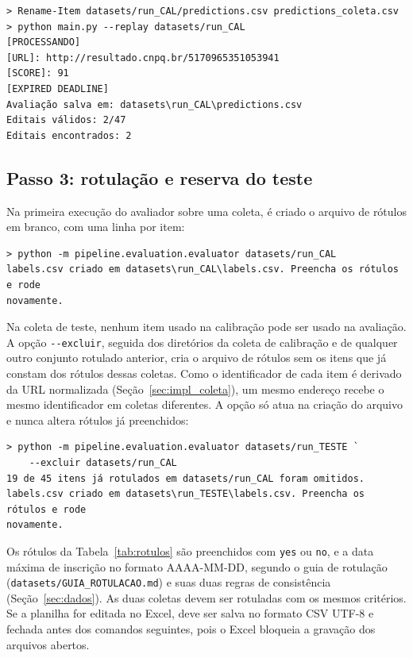 \begin{footnotesize}
\begin{verbatim}
> Rename-Item datasets/run_CAL/predictions.csv predictions_coleta.csv
> python main.py --replay datasets/run_CAL
[PROCESSANDO]
[URL]: http://resultado.cnpq.br/5170965351053941
[SCORE]: 91
[EXPIRED DEADLINE]
Avaliação salva em: datasets\run_CAL\predictions.csv
Editais válidos: 2/47
Editais encontrados: 2
\end{verbatim}
\end{footnotesize}

\subsection{Passo 3: rotulação e reserva do teste}

Na primeira execução do avaliador sobre uma coleta, é criado o arquivo de
rótulos em branco, com uma linha por item:

\begin{footnotesize}
\begin{verbatim}
> python -m pipeline.evaluation.evaluator datasets/run_CAL
labels.csv criado em datasets\run_CAL\labels.csv. Preencha os rótulos e rode
novamente.
\end{verbatim}
\end{footnotesize}

Na coleta de teste, nenhum item usado na calibração pode ser usado na
avaliação. A opção \texttt{-{}-excluir}, seguida dos diretórios da coleta de
calibração e de qualquer outro conjunto rotulado anterior, cria o arquivo de
rótulos sem os itens que já constam dos rótulos dessas coletas. Como o
identificador de cada item é derivado da URL normalizada
(Seção~\ref{sec:impl_coleta}), um mesmo endereço recebe o mesmo identificador
em coletas diferentes. A opção só atua na criação do arquivo e nunca altera
rótulos já preenchidos:

\begin{footnotesize}
\begin{verbatim}
> python -m pipeline.evaluation.evaluator datasets/run_TESTE `
    --excluir datasets/run_CAL
19 de 45 itens já rotulados em datasets/run_CAL foram omitidos.
labels.csv criado em datasets\run_TESTE\labels.csv. Preencha os rótulos e rode
novamente.
\end{verbatim}
\end{footnotesize}

Os rótulos da Tabela~\ref{tab:rotulos} são preenchidos com \texttt{yes} ou
\texttt{no}, e a data máxima de inscrição no formato AAAA-MM-DD, segundo o guia
de rotulação (\texttt{datasets/GUIA\_ROTULACAO.md}) e suas duas regras de
consistência (Seção~\ref{sec:dados}). As duas coletas devem ser rotuladas com
os mesmos critérios. Se a planilha for editada no Excel, deve ser salva no
formato CSV UTF-8 e fechada antes dos comandos seguintes, pois o Excel bloqueia
a gravação dos arquivos abertos.


